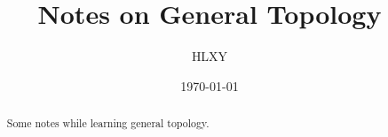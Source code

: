 \documentclass[a4paper]{article}
\title{Notes on General Topology}
\author{HLXY}
\date{\today}
\begin{document}
\maketitle
\begin{abstract}
    Some notes while learning general topology.
\end{abstract}
\tableofcontents
\end{document}
